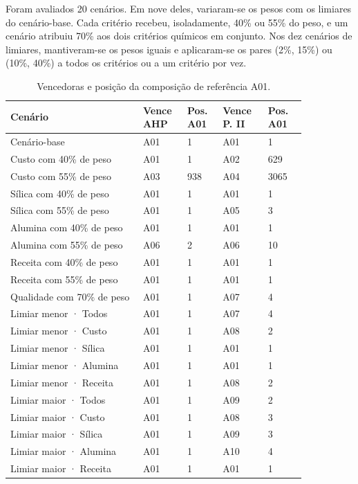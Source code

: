 \documentclass[12pt,a4paper]{article}
\begin{document}
Foram avaliados 20 cenários. Em nove deles, variaram-se os pesos com os limiares do cenário-base. Cada critério recebeu, isoladamente, 40\% ou 55\% do peso, e um cenário atribuiu 70\% aos dois critérios químicos em conjunto. Nos dez cenários de limiares, mantiveram-se os pesos iguais e aplicaram-se os pares (2\%, 15\%) ou (10\%, 40\%) a todos os critérios ou a um critério por vez.

\begin{table}[H]
\centering
\small
\caption{Vencedoras e posição da composição de referência A01.}
\begin{tabular}{@{}p{0.383\linewidth}p{0.119\linewidth}p{0.102\linewidth}p{0.136\linewidth}p{0.111\linewidth}@{}}
\toprule
Cenário & Vence AHP & Pos. A01 & Vence P. II & Pos. A01 \\
\midrule
Cenário-base & A01 & 1 & A01 & 1 \\
Custo com 40\% de peso & A01 & 1 & A02 & 629 \\
Custo com 55\% de peso & A03 & 938 & A04 & 3065 \\
Sílica com 40\% de peso & A01 & 1 & A01 & 1 \\
Sílica com 55\% de peso & A01 & 1 & A05 & 3 \\
Alumina com 40\% de peso & A01 & 1 & A01 & 1 \\
Alumina com 55\% de peso & A06 & 2 & A06 & 10 \\
Receita com 40\% de peso & A01 & 1 & A01 & 1 \\
Receita com 55\% de peso & A01 & 1 & A01 & 1 \\
Qualidade com 70\% de peso & A01 & 1 & A07 & 4 \\
Limiar menor · Todos & A01 & 1 & A07 & 4 \\
Limiar menor · Custo & A01 & 1 & A08 & 2 \\
Limiar menor · Sílica & A01 & 1 & A01 & 1 \\
Limiar menor · Alumina & A01 & 1 & A01 & 1 \\
Limiar menor · Receita & A01 & 1 & A08 & 2 \\
Limiar maior · Todos & A01 & 1 & A09 & 2 \\
Limiar maior · Custo & A01 & 1 & A08 & 3 \\
Limiar maior · Sílica & A01 & 1 & A09 & 3 \\
Limiar maior · Alumina & A01 & 1 & A10 & 4 \\
Limiar maior · Receita & A01 & 1 & A01 & 1 \\
\bottomrule
\end{tabular}
\end{table}
\end{document}
